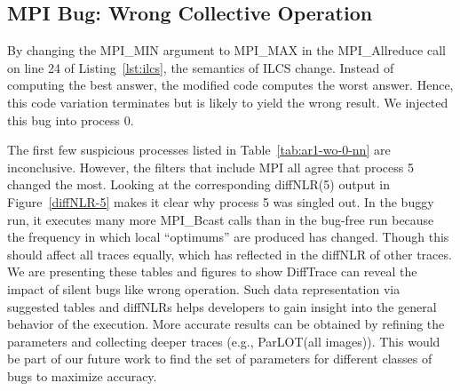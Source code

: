 





\subsection{MPI Bug: Wrong Collective Operation}

By changing the MPI\_MIN argument to MPI\_MAX in the MPI\_Allreduce call on line 24 of Listing~\ref{lst:ilcs}, the semantics of ILCS change. 
%
Instead of computing the best answer, the modified code computes the worst answer.
%
Hence, this code variation terminates but is likely to yield the wrong result.
%
We injected this bug into process 0.

The first few suspicious processes listed in Table~\ref{tab:ar1-wo-0-nn} are inconclusive. However, the filters that include MPI all agree that process 5 changed the most.
%
Looking at the corresponding diffNLR(5) output in Figure~\ref{diffNLR-5} makes it clear why process 5 was singled out. In the buggy run, it executes many more MPI\_Bcast calls than in the bug-free run because the frequency in which local ``optimums'' are produced has changed. Though this should affect all traces equally, which has reflected in the diffNLR of other traces. We are presenting these tables and figures to show DiffTrace can reveal the impact of silent bugs like wrong operation. Such data representation via suggested tables and diffNLRs helps developers to gain insight into the general behavior of the execution. More accurate results can be obtained by refining the parameters and collecting deeper traces (e.g., ParLOT(all images)). This would be part of our future work to find the set of parameters for different classes of bugs to maximize accuracy.






